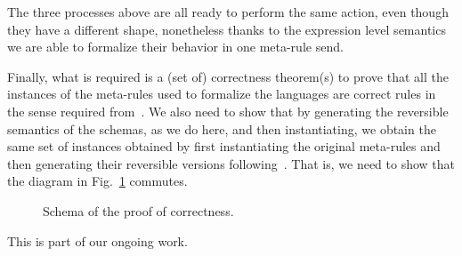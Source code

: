 \documentclass{article}[12pt,a4paper]
\theoremstyle{definition}
\begin{document}
The three processes above are all ready to perform the same action, even though
they have a different shape, nonetheless thanks to the expression level
semantics we are able to formalize their behavior in one meta-rule send.

Finally, what is required is a (set of) correctness theorem(s) to
prove that all the instances of the meta-rules used to formalize the
languages are correct rules in the sense required
from~\cite{LaneseM20}. We also need to show that by generating the
reversible semantics of the schemas, as we do here, and then
instantiating, we obtain the same set of instances obtained by first
instantiating the original meta-rules and then generating their
reversible versions following~\cite{LaneseM20}. That is, we need to
show that the diagram in Fig.~\ref{fig:square} commutes.

\begin{figure}
  \centering
  \caption{ Schema of the proof of correctness. }
  \label{fig:square}
\end{figure}

This is part of our ongoing work.


\end{document}
